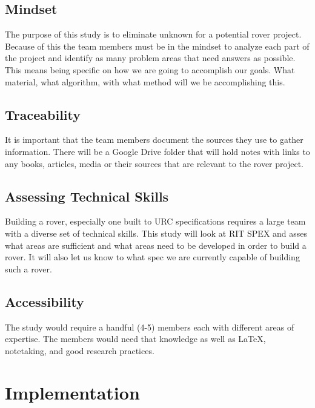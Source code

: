 \documentclass[conference]{IEEEtran} %
\begin{document}

\subsection{Mindset}
\label{subsec:mindset}
The purpose of this study is to eliminate unknown for a potential rover project. 
Because of this the team members must be in the mindset to analyze each part of the project and identify as many problem areas that need answers as possible. 
This means being specific on how we are going to accomplish our goals. 
What material, what algorithm, with what method will we be accomplishing this.

\subsection{Traceability}
\label{subsec:traceability}

It is important that the team members document the sources they use to gather information. 
There will be a Google Drive folder that will hold notes with links to any books, articles, media or their sources that are relevant to the rover project. 

\subsection{Assessing Technical Skills}
\label{subsec:assessing-technical-skills}

Building a rover, especially one built to URC specifications requires a large team with a diverse set of technical skills. 
This study will look at RIT SPEX and asses what areas are sufficient and what areas need to be developed in order to build a rover. 
It will also let us know to what spec we are currently capable of building such a rover. 

\subsection{Accessibility}
\label{subsec:plug-n-play}

The study would require a handful (4-5) members each with different areas of expertise. The members would need that knowledge as well as \LaTeX{}, notetaking, and good research practices.

\section{Implementation}
\label{sec:implementation}
\end{document}

